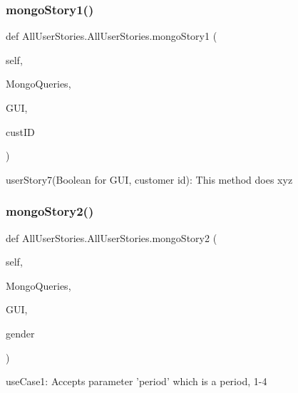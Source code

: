\subsubsection{\texorpdfstring{mongo\+Story1()}{mongoStory1()}}
{\footnotesize\ttfamily def All\+User\+Stories.\+All\+User\+Stories.\+mongo\+Story1 (\begin{DoxyParamCaption}\item[{}]{self,  }\item[{}]{Mongo\+Queries,  }\item[{}]{G\+UI,  }\item[{}]{cust\+ID }\end{DoxyParamCaption})}

\begin{DoxyVerb}userStory7(Boolean for GUI, customer id): This method does xyz \end{DoxyVerb}
 \hypertarget{class_all_user_stories_1_1_all_user_stories_a749505378bf81816d48d6f72553379d1}{}\label{class_all_user_stories_1_1_all_user_stories_a749505378bf81816d48d6f72553379d1} 
\subsubsection{\texorpdfstring{mongo\+Story2()}{mongoStory2()}}
{\footnotesize\ttfamily def All\+User\+Stories.\+All\+User\+Stories.\+mongo\+Story2 (\begin{DoxyParamCaption}\item[{}]{self,  }\item[{}]{Mongo\+Queries,  }\item[{}]{G\+UI,  }\item[{}]{gender }\end{DoxyParamCaption})}

\begin{DoxyVerb}useCase1: Accepts parameter 'period' which is a period, 1-4 \end{DoxyVerb}
 \hypertarget{class_all_user_stories_1_1_all_user_stories_a89b5e3cfc51a5cf4f8299b3c0695824d}{}\label{class_all_user_stories_1_1_all_user_stories_a89b5e3cfc51a5cf4f8299b3c0695824d} 
